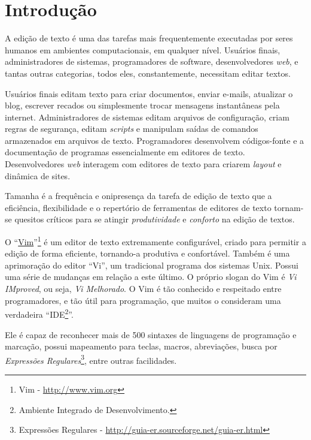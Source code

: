 
\chapter{Introdução}
%
A edição de texto é uma das tarefas mais frequentemente executadas por seres
humanos em ambientes computacionais, em qualquer nível. Usuários finais,
administradores de sistemas, programadores de software, desenvolvedores {\em
web}, e tantas outras categorias, todos eles, constantemente, necessitam
editar textos. 

Usuários finais editam texto para criar documentos, enviar e-mails, atualizar
o blog, escrever recados ou simplesmente trocar mensagens instantâneas pela
internet. Administradores de sistemas editam arquivos de configuração, criam
regras de segurança, editam {\em scripts} e manipulam saídas de comandos
armazenados em arquivos de texto. Programadores desenvolvem códigos-fonte e a
documentação de programas essencialmente em editores de texto.  Desenvolvedores {\em web}
interagem com editores de texto para criarem {\em layout} e dinâmica de sites.

Tamanha é a frequência e onipresença da tarefa de edição de texto que a
eficiência, flexibilidade e o repertório de ferramentas de editores de texto
tornam-se quesitos críticos para se atingir {\em produtividade} e {\em
conforto} na edição de textos.
%

O ``\href{http://www.vim.org}{Vim}''\footnote{Vim - \url{http://www.vim.org}}
 é um editor de texto extremamente configurável, criado para permitir a
edição de forma eficiente, tornando-a produtiva e confortável. 
Também é uma aprimoração do editor ``Vi'', um tradicional programa dos
sistemas Unix. Possui uma série de mudanças em relação a este último. O
próprio slogan do Vim é {\em Vi IMproved}, ou seja, {\em Vi Melhorado}.  O Vim
é tão conhecido e respeitado entre programadores, e tão útil para programação,
que muitos o consideram uma verdadeira ``IDE\footnote{Ambiente Integrado de
Desenvolvimento.}''.

Ele é capaz de reconhecer mais de 500 sintaxes de linguagens de programação e
marcação, possui mapeamento para teclas, macros, abreviações, busca por
{\em{Expressões
Regulares}}\footnote{Expressões Regulares - 
\url{http://guia-er.sourceforge.net/guia-er.html}}, entre outras facilidades.


